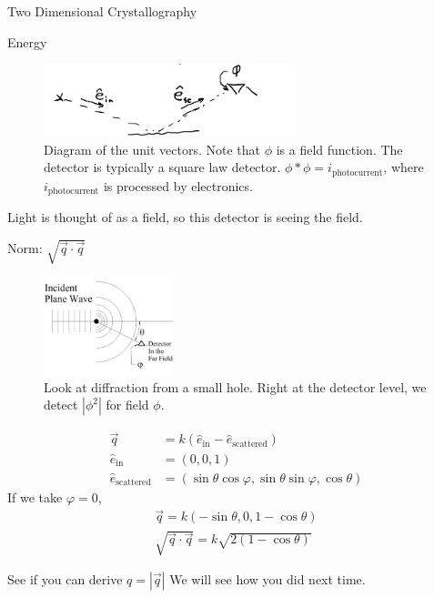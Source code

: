 \documentclass{article}
\newcommand{\norm}[1]{\left|#1\right|}
\begin{document}
\begin{section}{Two Dimensional Crystallography}
\begin{subsection}{Energy}
	\begin{figure}[h]
		\centering
		\includegraphics[height=60pt]{unitVectors}
		\caption{Diagram of the unit vectors. Note that $\phi$ is a field function. The detector is typically a square law detector. $\phi\ast\phi = i_\text{photocurrent}$, where $i_\text{photocurrent}$ is processed by electronics.}
		\label{fig:unitVectors}
	\end{figure}
	Light is thought of as a field, so this detector is seeing the field.

	Norm: $\sqrt{\vec{q}\cdot\vec{q}}$

	\begin{figure}[h]
		\centering
		\includegraphics[height=80pt]{atomWave2}
		\caption{Look at diffraction from a small hole. Right at the detector level, we detect $\norm{\phi^2}$ for field $\phi$.}
		\label{fig:atomWave}
	\end{figure}


	\begin{align*}
		\vec{q} &= k(\hat{e}_\text{in} - \hat{e}_\text{scattered})\\
		\hat{e}_\text{in} &= (0,0,1)\\
		\hat{e}_\text{scattered} &= (\sin{\theta}\cos{\varphi},\sin{\theta}\sin{\varphi},\cos{\theta})
	\end{align*}
	If we take $\varphi=0$,
	\begin{align*}
		\vec{q} = k(-\sin{\theta},0,1-\cos{\theta})\\
		\sqrt{\vec{q}\cdot\vec{q}} = k\sqrt{2(1-\cos{\theta})}
	\end{align*}

	See if you can derive $q = \norm{\vec{q}}$ We will see how you did next time.


\end{subsection}
\end{section}
\end{document}
